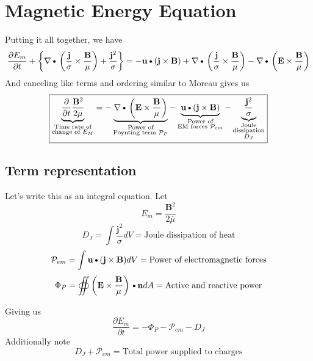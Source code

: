 \documentclass[11pt]{article}
\newcommand{\B}{\mathbf{B}}
\newcommand{\PD}{\partial}
\newcommand{\BM}{\frac{\mathbf{B}}{\mu}}
\newcommand{\J}{\mathbf{j}}
\newcommand{\E}{\mathbf{E}}
\newcommand{\N}{\mathbf{n}}
\newcommand{\JS}{\frac{\mathbf{j}}{\sigma}}
\newcommand{\JSS}{\frac{\mathbf{j}^2}{\sigma}}
\newcommand{\U}{\mathbf{u}}
\newcommand{\MO}{\overline{\mu}}
\newcommand{\DOT}{\text{\textbullet}}
\begin{document}
\section{Magnetic Energy Equation}
Putting it all together, we have
\begin{equation}
	\frac{\PD E_m}{\PD t} + 
	\left\{ \nabla \DOT \left(\JS \times \BM \right) + \JSS \right\} =
	- \U \DOT (\J \times \B) + 
	\nabla \DOT \left(\JS \times \BM \right) -
	\nabla \DOT \left(\E \times \BM \right)
\end{equation}
And canceling like terms and ordering similar to Moreau gives us
\begin{equation}
	\boxed{
	\underbrace{\frac{\PD }{\PD t} \frac{\B^2}{2 \mu}}_
	{\substack{\text{Time rate of}\\\text{change of $E_M$}}}
	=
	- \underbrace{\nabla \DOT \left(\E \times \BM \right)}_
	{\substack{\text{Power of}\\\text{Poynting term $\mathcal P_{P}$}}}
	- \underbrace{\U \DOT (\J \times \B)}_
	{\substack{\text{Power of}\\\text{EM forces $\mathcal P_{em}$}}}
	- \underbrace{\JSS}_
	{\substack{\text{Joule}\\\text{dissipation}\\\text{$D_J$}}}
	}
\end{equation}
\subsection{Term representation}
Let's write this as an integral equation. Let
\begin{equation}
	E_m = \frac{\B^2}{2 \MO}
\end{equation}
\begin{equation}
	D_J = \int \JSS dV = \text{Joule dissipation of heat}
\end{equation}
\begin{equation}
	\mathcal P_{em} = \int \U \DOT (\J \times \B) dV = \text{Power of electromagnetic forces}
\end{equation}
\begin{equation}
	\Phi_P = \oiint \left( \E \times \BM \right) \DOT \N dA = \text{Active and reactive power}
\end{equation}

Giving us
\begin{equation}
	\boxed{
	\frac{\PD E_m}{\PD t}
	=
	- \Phi_P
	- \mathcal P_{em}
	- D_J
	}
\end{equation}
Additionally note
\begin{equation}
	D_J + \mathcal P_{em} = \text{Total power supplied to charges}
\end{equation}
\end{document}
